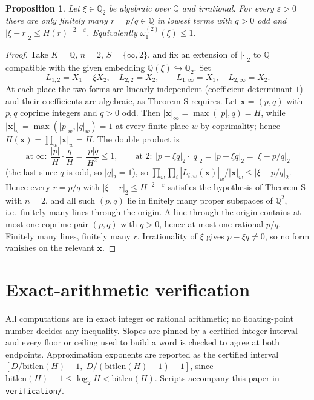 \documentclass[11pt,reqno]{amsart}
\theoremstyle{plain}
\newtheorem{proposition}[theorem]{Proposition}
\theoremstyle{definition}
\newcommand{\Q}{\mathbb{Q}}
\newcommand{\Qt}{\Q_2}
\newcommand{\om}{\omega_1^{(2)}}
\begin{document}
\begin{proposition}\label{prop:Rderiv}
Let $\xi\in\Qt$ be algebraic over $\Q$ and irrational. For every $\varepsilon>0$ there are only
finitely many $r=p/q\in\Q$ in lowest terms with $q>0$ odd and $|\xi-r|_2\le H(r)^{-2-\varepsilon}$.
Equivalently $\om(\xi)\le1$.
\end{proposition}

\begin{proof}
Take $K=\Q$, $n=2$, $S=\{\infty,2\}$, and fix an extension of $|\cdot|_2$ to $\overline{\Q}$
compatible with the given embedding $\Q(\xi)\hookrightarrow\Qt$. Set
\[
  L_{1,2}=X_1-\xi X_2,\quad L_{2,2}=X_2,\qquad L_{1,\infty}=X_1,\quad L_{2,\infty}=X_2 .
\]
At each place the two forms are linearly independent (coefficient determinant $1$) and their
coefficients are algebraic, as Theorem S requires. Let $\mathbf{x}=(p,q)$ with $p,q$ coprime
integers and $q>0$ odd. Then $|\mathbf{x}|_\infty=\max(|p|,q)=H$, while
$|\mathbf{x}|_w=\max(|p|_w,|q|_w)=1$ at every finite place $w$ by coprimality; hence
$H(\mathbf{x})=\prod_w|\mathbf{x}|_w=H$. The double product is
\[
  \text{at }\infty:\ \frac{|p|}{H}\cdot\frac{q}{H}=\frac{|p|q}{H^{2}}\le1,
  \qquad
  \text{at }2:\ |p-\xi q|_2\cdot|q|_2=|p-\xi q|_2=|\xi-p/q|_2
\]
(the last since $q$ is odd, so $|q|_2=1$), so
$\prod_w\prod_i|L_{i,w}(\mathbf{x})|_w/|\mathbf{x}|_w\le|\xi-p/q|_2$. Hence every $r=p/q$ with
$|\xi-r|_2\le H^{-2-\varepsilon}$ satisfies the hypothesis of Theorem S with $n=2$, and all such
$(p,q)$ lie in finitely many proper subspaces of $\Q^{2}$, i.e.\ finitely many lines through the
origin. A line through the origin contains at most one coprime pair $(p,q)$ with $q>0$, hence at
most one rational $p/q$. Finitely many lines, finitely many $r$. Irrationality of $\xi$ gives
$p-\xi q\ne0$, so no form vanishes on the relevant $\mathbf{x}$.
\end{proof}

\section{Exact-arithmetic verification}\label{app:verif}

All computations are in exact integer or rational arithmetic; no floating-point number decides any
inequality. Slopes are pinned by a certified integer interval and every floor or ceiling used to
build a word is checked to agree at both endpoints. Approximation exponents are reported as the
certified interval $[D/\mathrm{bitlen}(H)-1,\;D/(\mathrm{bitlen}(H)-1)-1]$, since
$\mathrm{bitlen}(H)-1\le\log_2 H<\mathrm{bitlen}(H)$. Scripts accompany this paper in
\texttt{verification/}.
\end{document}
